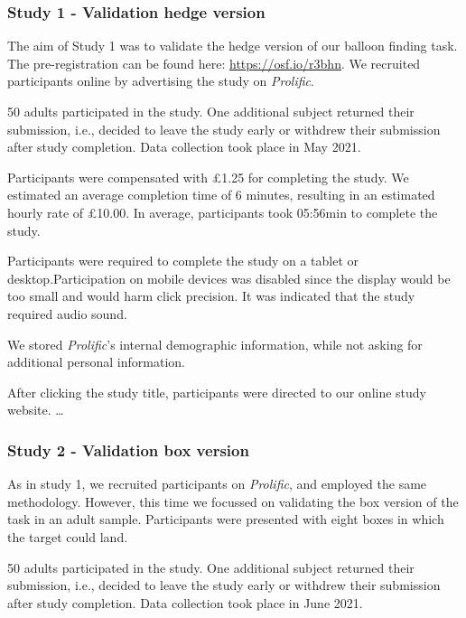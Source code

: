 \documentclass[
  english,
  man,floatsintext]{apa6}
\begin{document}
\hypertarget{study-1---validation-hedge-version}{%
\subsubsection{Study 1 - Validation hedge version}\label{study-1---validation-hedge-version}}

The aim of Study 1 was to validate the hedge version of our balloon finding task. The pre-registration can be found here: \url{https://osf.io/r3bhn}. We recruited participants online by advertising the study on \emph{Prolific}.

50 adults participated in the study. One additional subject returned their submission, i.e., decided to leave the study early or withdrew their submission after study completion. Data collection took place in May 2021.

Participants were compensated with £1.25 for completing the study. We estimated an average completion time of 6 minutes, resulting in an estimated hourly rate of £10.00. In average, participants took 05:56min to complete the study.

Participants were required to complete the study on a tablet or desktop.Participation on mobile devices was disabled since the display would be too small and would harm click precision. It was indicated that the study required audio sound.

We stored \emph{Prolific}'s internal demographic information,
while not asking for additional personal information.

After clicking the study title, participants were directed to our online study website.
\ldots{}

\hypertarget{study-2---validation-box-version}{%
\subsubsection{Study 2 - Validation box version}\label{study-2---validation-box-version}}

As in study 1, we recruited participants on \emph{Prolific}, and employed the same methodology. However, this time we focussed on validating the box version of the task in an adult sample. Participants were presented with eight boxes in which the target could land.

50 adults participated in the study. One additional subject returned their submission, i.e., decided to leave the study early or withdrew their submission after study completion. Data collection took place in June 2021.
\end{document}
